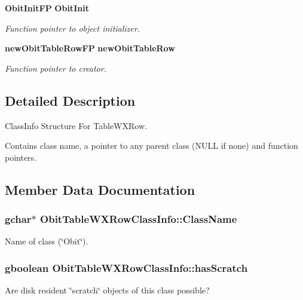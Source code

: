 \begin{CompactItemize}
{\bf Obit\-Init\-FP} {\bf Obit\-Init}
\begin{CompactList}\small\item\em Function pointer to object initializer. \item\end{CompactList}\item 
{\bf new\-Obit\-Table\-Row\-FP} {\bf new\-Obit\-Table\-Row}
\begin{CompactList}\small\item\em Function pointer to creator. \item\end{CompactList}\end{CompactItemize}


\subsection{Detailed Description}
Class\-Info Structure For Table\-WXRow. 

Contains class name, a pointer to any parent class (NULL if none) and function pointers. 



\subsection{Member Data Documentation}
\subsubsection{\setlength{\rightskip}{0pt plus 5cm}gchar$\ast$ {\bf Obit\-Table\-WXRow\-Class\-Info::Class\-Name}}\label{structObitTableWXRowClassInfo_o2}


Name of class (\char`\"{}Obit\char`\"{}). 

\subsubsection{\setlength{\rightskip}{0pt plus 5cm}gboolean {\bf Obit\-Table\-WXRow\-Class\-Info::has\-Scratch}}\label{structObitTableWXRowClassInfo_o1}


Are disk resident \char`\"{}scratch\char`\"{} objects of this class possible? 

